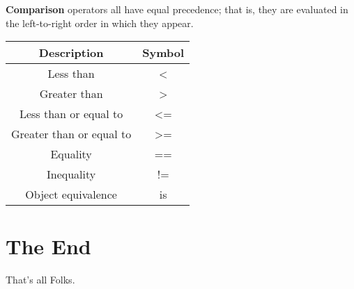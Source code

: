 \documentclass[a4paper,9pt]{extarticle}
\begin{document}
\begin{multicols*}{2}
\textbf{Comparison} operators all have equal precedence; that is, they are evaluated in the left-to-right order in which they appear.

\begin{center}
 \begin{tabular}{||c c||}
 \hline
 \textbf{Description} & \textbf{Symbol} \\ [1ex]
 \hline\hline
 Less than & < \\
 \hline
 Greater than & > \\
 \hline
 Less than or equal to & <= \\
 \hline
 Greater than or equal to & >= \\
 \hline
 Equality & == \\
 \hline
 Inequality & != \\
 \hline
 Object equivalence & is \\
 \hline
\end{tabular}
\end{center}


\section{The End}
That's all Folks.

\end{multicols*}
\end{document}
